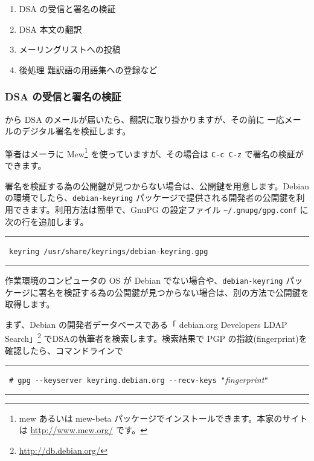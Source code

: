 \documentclass[mingoth,a4paper]{jsarticle}
\begin{document}
\begin{enumerate}
\item DSA の受信と署名の検証
\item DSA 本文の翻訳
\item {} メーリングリストへの投稿
\item 後処理 難訳語の用語集への登録など
\end{enumerate}

\subsubsection{DSA の受信と署名の検証}

 から DSA のメールが届いたら、翻訳に取り掛かりますが、その前に 一応メールのデジタル署名を検証します。

筆者はメーラに Mew\footnote{mew あるいは mew-beta パッケージでインストールできます。本家のサイトは \url{http://www.mew.org/} です。} を使っていますが、その場合は \texttt{C-c C-z} で署名の検証ができます。

署名を検証する為の公開鍵が見つからない場合は、公開鍵を用意します。Debian の環境でしたら、\texttt{debian-keyring} パッケージで提供される開発者の公開鍵を利用できます。利用方法は簡単で、GnuPG の設定ファイル \texttt{\~{}/.gnupg/gpg.conf} に次の行を追加します。

\hfil\begin{minipage}{0.9\linewidth}
\vspace*{1em}
\hrule
\vrule height1.7em depth 1em
\hfil{\ \verb+keyring /usr/share/keyrings/debian-keyring.gpg+
}\hfill\vrule height1.7em depth 1em
\hrule
\vspace*{1em}
\end{minipage}\hfil


作業環境のコンピュータの OS が Debian でない場合や、\texttt{debian-keyring} パッケージに署名を検証する為の公開鍵が見つからない場合は、別の方法で公開鍵を取得します。

まず、Debian の開発者データベースである「 debian.org Developers LDAP Search」\footnote{\url{http://db.debian.org/}} でDSAの執筆者を検索します。検索結果で PGP の指紋(fingerprint)を確認したら、コマンドラインで

\hfil\begin{minipage}{0.9\linewidth}
\vspace*{1em}
\hrule
\vrule height1.7em depth 1em
\hfil{\ \verb+# gpg --keyserver keyring.debian.org --recv-keys "+{\it fingerprint}\verb+"+
}\hfill\vrule height1.7em depth 1em
\hrule
\vspace*{1em}
\end{minipage}\hfil
\end{document}
